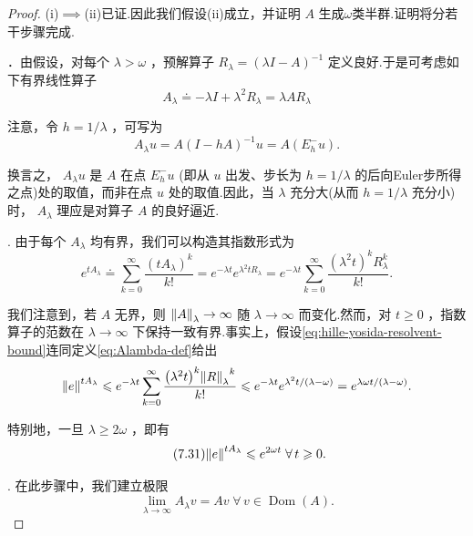 \begin{proof}
(i)$\implies$(ii)已证.因此我们假设(ii)成立，并证明 $A$ 生成$\omega$类半群.证明将分若干步骤完成.

．由假设，对每个 $\lambda  > \omega$ ，预解算子 ${R}_{\lambda } = {\left( \lambda I - A\right) }^{-1}$ 定义良好.于是可考虑如下有界线性算子
\begin{equation}\tag{7.30}\label{eq:Alambda-def}
{A}_{\lambda } \doteq   - {\lambda I} + {\lambda }^{2}{R}_{\lambda } = {\lambda A}{R}_{\lambda }
\end{equation}

注意，令 $h = 1/\lambda$ ，可写为
\[
{A}_{\lambda }u = A{\left( I - hA\right) }^{-1}u = A\left( {{E}_{h}^{ - }u}\right) .
\]

换言之， ${A}_{\lambda }u$ 是 $A$ 在点 ${E}_{h}^{ - }u$ (即从 $u$ 出发、步长为 $h = 1/\lambda$ 的后向Euler步所得之点)处的取值，而非在点 $u$ 处的取值.因此，当 $\lambda$ 充分大(从而 $h = 1/\lambda$ 充分小)时， ${A}_{\lambda }$ 理应是对算子 $A$ 的良好逼近.

. 由于每个 ${A}_{\lambda }$ 均有界，我们可以构造其指数形式为
\[
{e}^{t{A}_{\lambda }} \doteq  \mathop{\sum }\limits_{{k = 0}}^{\infty }\frac{{\left( t{A}_{\lambda }\right) }^{k}}{k!} = {e}^{-{\lambda t}}{e}^{{\lambda }^{2}t{R}_{\lambda }} = {e}^{-{\lambda t}}\mathop{\sum }\limits_{{k = 0}}^{\infty }\frac{{\left( {\lambda }^{2}t\right) }^{k}{R}_{\lambda }^{k}}{k!}.
\]

我们注意到，若 $A$ 无界，则 $\norm{A}_{\lambda } \rightarrow  \infty$ 随 $\lambda  \rightarrow  \infty$ 而变化.然而，对 $t \geq  0$ ，指数算子的范数在 $\lambda  \rightarrow  \infty$ 下保持一致有界.事实上，假设\eqref{eq:hille-yosida-resolvent-bound}连同定义\eqref{eq:Alambda-def}给出
\[
\norm{e}^{t{A}_{\lambda }} \leqslant  {e}^{-{\lambda t}}\mathop{\sum }\limits_{{k = 0}}^{\infty }\frac{{\left( {\lambda }^{2}t\right) }^{k}{\norm{R}_{\lambda }}^{k}}{k!} \leqslant  {e}^{-{\lambda t}}{e}^{{\lambda }^{2}t/\left( {\lambda  - \omega }\right) } = {e}^{{\lambda \omega t}/\left( {\lambda  - \omega }\right) }.
\]

特别地，一旦 $\lambda  \geq  {2\omega }$ ，即有
\begin{equation}\tag{7.31}\label{eq:exp-Alambda-bound}
\norm{e}^{t{A}_{\lambda }} \leqslant  {e}^{2\omega t}\;\forall\,t \geqslant  0.
\end{equation}

. 在此步骤中，我们建立极限
\begin{equation}\tag{7.32}\label{eq:Alambda-converges-on-domain}
\mathop{\lim }\limits_{{\lambda  \rightarrow  \infty }}{A}_{\lambda }v = {Av}\;\forall\,v \in  \operatorname{Dom}\left( A\right) .
\end{equation}


\end{proof}
